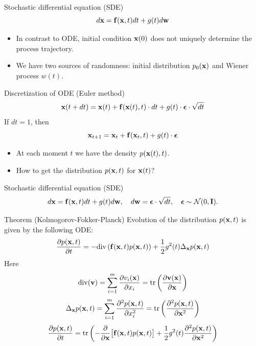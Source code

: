 \begin{frame}{Stochastic differential equation (SDE)}
	\[
		d\mathbf{x} = \mathbf{f}(\mathbf{x}, t) dt + g(t) d \mathbf{w}
	\]
	\vspace{-0.3cm}
	\begin{itemize}
		\item In contrast to ODE, initial condition $\mathbf{x}(0)$ does not uniquely determine the process trajectory.
		\item We have two sources of randomness: initial distribution $p_0(\mathbf{x})$ and Wiener process $w(t)$.
	\end{itemize}
	\begin{block}{Discretization of ODE (Euler method)}
		\vspace{-0.3cm}
		\[
			\mathbf{x}(t + dt) = \mathbf{x}(t) + \mathbf{f}(\mathbf{x}(t), t) \cdot dt + g(t) \cdot \boldsymbol{\epsilon} \cdot \sqrt{dt}
		\]
		If $dt = 1$, then
		\[
			\mathbf{x}_{t + 1} = \mathbf{x}_t + \mathbf{f}(\mathbf{x}_t, t) + g(t) \cdot \boldsymbol{\epsilon}
		\]
		\vspace{-0.5cm}
	\end{block}
	\begin{itemize}
		\item At each moment $t$ we have the density $p(\mathbf{x}(t), t)$.
		\item How to get the distribution $p(\mathbf{x}, t)$ for $\mathbf{x}(t)$?
	\end{itemize}
\end{frame}
\begin{frame}{Stochastic differential equation (SDE)}
	\vspace{-0.4cm}
	\[
		d\mathbf{x} = \mathbf{f}(\mathbf{x}, t) dt + g(t) d \mathbf{w}, \quad d \mathbf{w} = \boldsymbol{\epsilon} \cdot \sqrt{dt}, \quad \boldsymbol{\epsilon} \sim \mathcal{N}(0, \mathbf{I}).
	\]
	\vspace{-0.4cm}
 	\begin{block}{Theorem (Kolmogorov-Fokker-Planck)}
 		Evolution of the distribution $p(\mathbf{x}, t)$ is given by the following ODE:
 		\vspace{-0.2cm}
 		\[
 			\frac{\partial p(\mathbf{x}, t)}{\partial t} = - \text{div}\left(\mathbf{f}(\mathbf{x}, t) p(\mathbf{x}, t)\right) + \frac{1}{2}g^2(t) \Delta_{\mathbf{x}}p(\mathbf{x}, t)
 		\]
 		Here
 		\[
 			\text{div} (\mathbf{v}) = \sum_{i=1}^m \frac{\partial v_i(\mathbf{x})}{\partial x_i} = \text{tr}\left( \frac{\partial \mathbf{v}(\mathbf{x})}{\partial \mathbf{x}}  \right)
 		\]
 		\[
 			\Delta_{\mathbf{x}}p(\mathbf{x}, t) = \sum_{i=1}^m \frac{\partial^2 p(\mathbf{x}, t)}{\partial x_i^2} = \text{tr}\left( \frac{\partial^2 p(\mathbf{x}, t)}{\partial \mathbf{x}^2}  \right)
 		\]
 		\[
 			\frac{\partial p(\mathbf{x}, t)}{\partial t} = \text{tr}\left(- \frac{\partial}{\partial \mathbf{x}} \bigl[ \mathbf{f}(\mathbf{x}, t) p(\mathbf{x}, t)\bigr] + \frac{1}{2} g^2(t) \frac{\partial^2 p(\mathbf{x}, t)}{\partial \mathbf{x}^2} \right)
 		\]
 	\end{block}
\end{frame}
